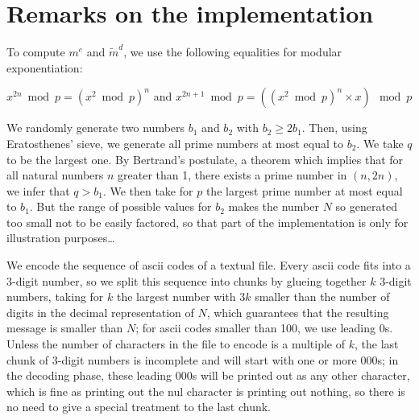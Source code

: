 \documentclass{amsart}
\begin{document}
\section{Remarks on the implementation}

To compute $m^e$ and $\widetilde{m}^d$, we use the following equalities for modular exponentiation:
%
\begin{center}
$x^{2n}\bmod p=(x^2\bmod p)^n$ and $x^{2n+1}\bmod p=((x^2\bmod p)^n\times x)\mod p$
\end{center}
%
We randomly generate two numbers $b_1$ and $b_2$ with $b_2\geq 2b_1$. Then, using Eratosthenes' sieve, we generate all prime numbers at most equal to $b_2$. We take $q$ to be the largest one. By Bertrand's postulate, a theorem which implies that for all natural numbers $n$ greater than 1, there exists a prime number in $(n,2n)$, we infer that $q>b_1$. We then take for $p$ the largest prime number at most equal to $b_1$. But the range of possible values for $b_2$ makes the number $N$ so generated too small not to be easily factored, so that part of the implementation is only for illustration purposes\dots

We encode the sequence of ascii codes of a textual file. Every ascii code fits into a 3-digit number, so we split this sequence into chunks by glueing together $k$ 3-digit numbers, taking for $k$ the largest number with $3k$ smaller than the number of digits in the decimal representation of $N$, which guarantees that the resulting message is smaller than $N$; for ascii codes smaller than 100, we use leading 0s. Unless the number of characters in the file to encode is a multiple of $k$, the last chunk of 3-digit numbers is incomplete and will start with one or more 000s; in the decoding phase, these leading 000s will be printed out as any other character, which is fine as printing out the nul character is printing out nothing, so there is no need to give a special treatment to the last chunk.
\end{document}
